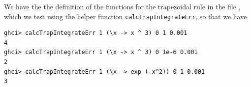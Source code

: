 We have the the definition of the functions for the trapezoidal rule in the file 
, which we test using the helper function 
\verb|calcTrapIntegrateErr|, so that we have

\begin{lstlisting}
ghci> calcTrapIntegrateErr 1 (\x -> x ^ 3) 0 1 0.001
4
ghci> calcTrapIntegrateErr 1 (\x -> x ^ 3) 0 1e-6 0.001
2
ghci> calcTrapIntegrateErr 1 (\x -> exp (-x^2)) 0 1 0.001
3
\end{lstlisting}
